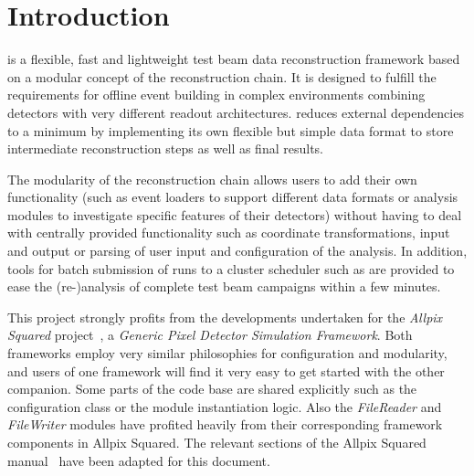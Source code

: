 \chapter{Introduction}
\label{ch:introduction}

\corry is a flexible, fast and lightweight test beam data reconstruction framework based on a modular concept of the reconstruction chain.
It is designed to fulfill the requirements for offline event building in complex environments combining detectors with very different readout architectures.
\corry reduces external dependencies to a minimum by implementing its own flexible but simple data format to store intermediate reconstruction steps as well as final results.

The modularity of the reconstruction chain allows users to add their own functionality (such as event loaders to support different data formats or analysis modules to investigate specific features of their detectors) without having to deal with centrally provided functionality such as coordinate transformations, input and output or parsing of user input and configuration of the analysis.
In addition, tools for batch submission of runs to a cluster scheduler such as  are provided to ease the (re-)analysis of complete test beam campaigns within a few minutes.

This project strongly profits from the developments undertaken for the \emph{Allpix Squared} project~\cite{apsq,apsq-website}, a \emph{Generic Pixel Detector Simulation Framework}.
Both frameworks employ very similar philosophies for configuration and modularity, and users of one framework will find it very easy to get started with the other companion.
Some parts of the code base are shared explicitly such as the configuration class or the module instantiation logic.
Also the \textit{FileReader} and \textit{FileWriter} modules have profited heavily from their corresponding framework components in Allpix Squared.
The relevant sections of the Allpix Squared manual~\cite{apsq-manual,clicdp-apsq-manual} have been adapted for this document.

